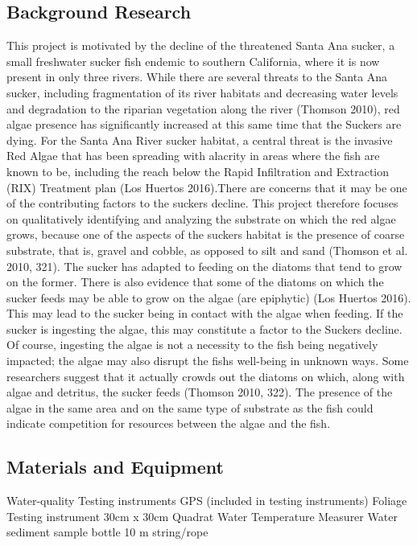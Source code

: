 \documentclass{article}
\begin{document}
\subsection{Background Research} 
This project is motivated by the decline of the threatened Santa Ana sucker, a small freshwater sucker ﬁsh endemic to southern California, where it is now present in only three rivers. While there are several threats to the Santa Ana sucker, including fragmentation of its river habitats and decreasing water levels and degradation to the riparian vegetation along the river (Thomson 2010), red algae presence has significantly increased at this same time that the Suckers are dying. For the Santa Ana River sucker habitat, a central threat is the invasive Red Algae that has been spreading with alacrity in areas where the ﬁsh are known to be, including the reach below the Rapid Inﬁltration and Extraction (RIX) Treatment plan (Los Huertos 2016).There are concerns that it may be one of the contributing factors to the suckers decline. This project therefore focuses on qualitatively identifying and analyzing the substrate on which the red algae grows, because one of the aspects of the suckers habitat is the presence of coarse substrate, that is, gravel and cobble, as opposed to silt and sand (Thomson et al. 2010, 321). The sucker has adapted to feeding on the diatoms that tend to grow on the former. There is also evidence that some of the diatoms on which the sucker feeds may be able to grow on the algae (are epiphytic) (Los Huertos 2016). This may lead to the sucker being in contact with the algae when feeding. If the sucker is ingesting the algae, this may constitute a factor to the Suckers decline. Of course, ingesting the algae is not a necessity to the ﬁsh being negatively impacted; the algae may also disrupt the ﬁshs well-being in unknown ways. Some researchers suggest that it actually crowds out the diatoms on which, along with algae and detritus, the sucker feeds (Thomson 2010, 322). The presence of the algae in the same area and on the same type of substrate as the ﬁsh could indicate competition for resources between the algae and the ﬁsh.


\subsection{Materials and Equipment}

Water-quality Testing instruments GPS (included in testing instruments) Foliage Testing instrument 30cm x 30cm Quadrat Water Temperature Measurer Water sediment sample bottle 10 m string/rope
\end{document}

